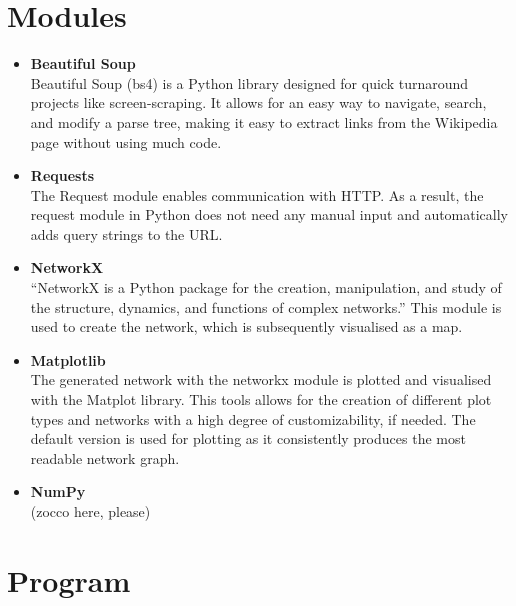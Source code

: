 \documentclass[10pt]{article}
\begin{document}
\section{Modules}

 \begin{itemize}    %
        \item\textbf{Beautiful Soup}\\
	Beautiful Soup (bs4) is a Python library designed for quick turnaround projects like screen-scraping. It allows for an easy way to navigate, search, and modify a parse tree, making it 	easy to extract links from the Wikipedia page without using much code. \cite{cru} 
 
        \item \textbf{Requests}\\
 	The Request module enables communication with HTTP. As a result, the request module in Python does not need any manual input and automatically adds query strings to the  	
	URL.   \cite{req}
	
        \item \textbf{NetworkX}\\
	``NetworkX is a Python package for the creation, manipulation, and study of the structure, dynamics, and functions of complex networks.'' \cite{net} This module is used to create 
	the network, which is subsequently visualised as a map. 
	
        \item \textbf{Matplotlib}\\
        The generated network with the networkx module is plotted and visualised with the Matplot library. This tools allows for the creation of different plot types and networks with a high 	
        degree of customizability, if needed. The default version is used for plotting as it consistently produces the most readable network graph. 
        
        \item \textbf{NumPy}\\
        
        (zocco here, please)
        
        
    \end{itemize}
 

\section{Program}
\end{document}
